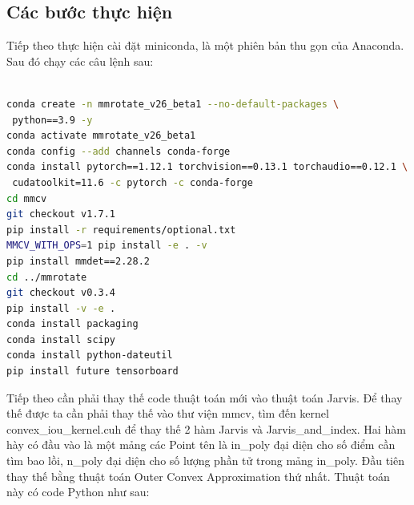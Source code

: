 \documentclass[12pt,a4paper,openany,oneside]{report}
\begin{document}
\subsection{Các bước thực hiện}
Tiếp theo thực hiện cài đặt miniconda, là một phiên bản thu gọn của Anaconda. Sau đó chạy các câu lệnh sau:


\begin{lstlisting}[language=bash, caption={Mô tả lệnh command line}, label={lst:command-line}]

conda create -n mmrotate_v26_beta1 --no-default-packages \
 python==3.9 -y 
conda activate mmrotate_v26_beta1 
conda config --add channels conda-forge 
conda install pytorch==1.12.1 torchvision==0.13.1 torchaudio==0.12.1 \
 cudatoolkit=11.6 -c pytorch -c conda-forge 
cd mmcv
git checkout v1.7.1
pip install -r requirements/optional.txt 
MMCV_WITH_OPS=1 pip install -e . -v 
pip install mmdet==2.28.2 
cd ../mmrotate 
git checkout v0.3.4
pip install -v -e . 
conda install packaging 
conda install scipy 
conda install python-dateutil
pip install future tensorboard

\end{lstlisting}

Tiếp theo cần phải thay thế code thuật toán mới vào thuật toán Jarvis. Để thay thế được ta cần phải thay thế vào thư viện mmcv, tìm đến kernel convex\_iou\_kernel.cuh để thay thế 2 hàm Jarvis và Jarvis\_and\_index. Hai hàm hày có đầu vào là một mảng các Point tên là in\_poly đại diện cho số điểm cần tìm bao lồi, n\_poly đại diện cho số lượng phần tử trong mảng in\_poly. Đầu tiên thay thế bằng thuật toán Outer Convex Approximation thứ nhất. Thuật toán này có code Python như sau:
\end{document}
